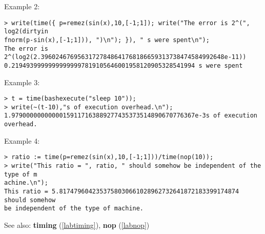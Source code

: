 \noindent Example 2: 
\begin{center}\begin{minipage}{15cm}\begin{Verbatim}[frame=single]
> write(time({ p=remez(sin(x),10,[-1;1]); write("The error is 2^(", log2(dirtyin
fnorm(p-sin(x),[-1;1])), ")\n"); }), " s were spent\n");
The error is 2^(log2(2.39602467695631727848641768186659313738474584992648e-11))
0.21949399999999999997819105646001958120905328541994 s were spent
\end{Verbatim}
\end{minipage}\end{center}
\noindent Example 3: 
\begin{center}\begin{minipage}{15cm}\begin{Verbatim}[frame=single]
> t = time(bashexecute("sleep 10"));
> write(~(t-10),"s of execution overhead.\n");
1.97900000000000159117163889277435373514890670776367e-3s of execution overhead.
\end{Verbatim}
\end{minipage}\end{center}
\noindent Example 4: 
\begin{center}\begin{minipage}{15cm}\begin{Verbatim}[frame=single]
> ratio := time(p=remez(sin(x),10,[-1;1]))/time(nop(10));
> write("This ratio = ", ratio, " should somehow be independent of the type of m
achine.\n");
This ratio = 5.8174796042353758030661028962732641872183399174874 should somehow 
be independent of the type of machine.
\end{Verbatim}
\end{minipage}\end{center}
See also: \textbf{timing} (\ref{labtiming}), \textbf{nop} (\ref{labnop})
